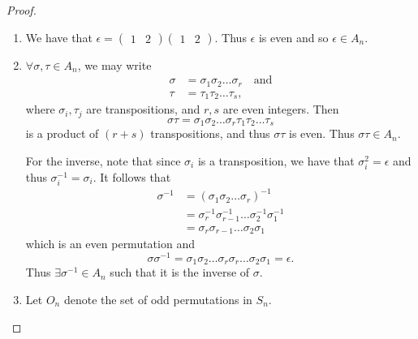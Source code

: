 \begin{proof}
  \begin{enumerate}
    \item We have that $\epsilon = \begin{pmatrix} 1 & 2 \end{pmatrix} \begin{pmatrix} 1 & 2 \end{pmatrix}$. Thus $\epsilon$ is even and so $\epsilon \in A_n$.
    \item $\forall \sigma, \tau \in A_n$, we may write
      \begin{align*}
        \sigma &= \sigma_1 \sigma_2 \hdots \sigma_r \quad \text{and} \\
        \tau   &= \tau_1 \tau_2 \hdots \tau_s,
      \end{align*}
      where $\sigma_i, \tau_j$ are transpositions, and $r, s$ are even integers. Then
      \begin{equation*}
        \sigma \tau = \sigma_1 \sigma_2 \hdots \sigma_r \tau_1 \tau_2 \hdots \tau_s
      \end{equation*}
      is a product of $(r + s)$ transpositions, and thus $\sigma \tau$ is even. Thus $\sigma \tau \in A_n$.

      For the inverse, note that since $\sigma_i$ is a transposition, we have that $\sigma_i^2 = \epsilon$ and thus $\sigma_i^{-1} = \sigma_i$. It follows that
      \begin{align*}
        \sigma^{-1} &= (\sigma_1 \sigma_2 \hdots \sigma_r)^{-1} \\
          &= \sigma_r^{-1} \sigma_{r - 1}^{-1} \hdots \sigma_2^{-1} \sigma_1^{-1} \\
          &= \sigma_r \sigma_{r - 1} \hdots \sigma_2 \sigma_1
      \end{align*}
      which is an even permutation and
      \begin{equation*}
        \sigma \sigma^{-1} = \sigma_1 \sigma_2 \hdots \sigma_r \sigma_r \hdots \sigma_2 \sigma_1 = \epsilon.
      \end{equation*}
      Thus $\exists \sigma^{-1} \in A_n$ such that it is the inverse of $\sigma$.
    \item Let $O_n$ denote the set of odd permutations in $S_n$.
\end{enumerate}
\end{proof}
